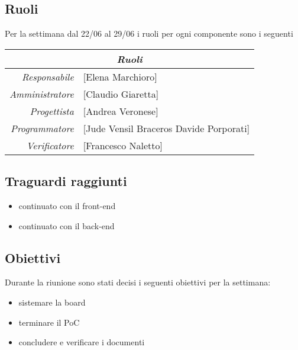 \documentclass[12pt]{article}
\begin{document}
\subsection{Ruoli}
Per la settimana dal 22/06 al 29/06 i ruoli per ogni componente sono i seguenti
\\
\begin{tabular}{r | l}
    \multicolumn{2}{c}{\textit{Ruoli}}\\
    \hline
        \textit{Responsabile} &
        [Elena Marchioro]\makecell{}\\
        \textit{Amministratore} &
        [Claudio Giaretta]\makecell{}\\
        \textit{Progettista} &
        [Andrea Veronese]\makecell{}\\
        \textit{Programmatore} &
        [Jude Vensil Braceros Davide Porporati]\makecell{}\\
        \textit{Verificatore} & 
        [Francesco Naletto]\makecell{}\\
\end{tabular}

\subsection{Traguardi raggiunti}
\begin{itemize}
    \item continuato con il front-end
    \item continuato con il back-end
    
\end{itemize}

\subsection{Obiettivi}
Durante la riunione sono stati decisi i seguenti obiettivi per la settimana:
\begin{itemize}
    \item sistemare la board
    \item terminare il PoC
    \item concludere e verificare i documenti

    
\end{itemize}
\end{document}
